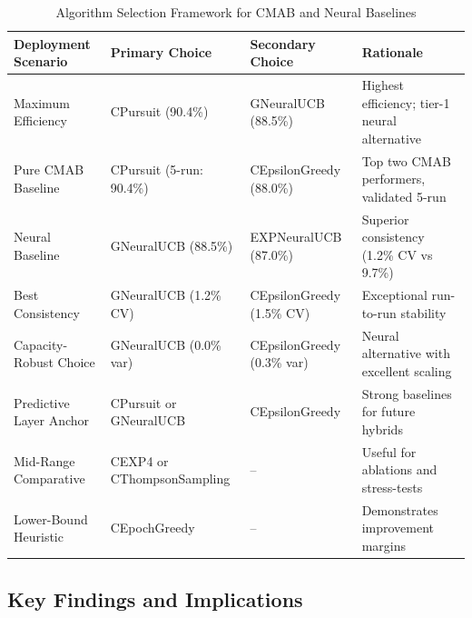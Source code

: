 \documentclass[12pt,a4paper]{article}
\begin{document}
\begin{table}[H]
\scriptsize
\centering
\caption{Algorithm Selection Framework for CMAB and Neural Baselines}
\begin{tabular}{|l|l|l|l|}
\hline
\textbf{Deployment Scenario} & \textbf{Primary Choice} & \textbf{Secondary Choice} & \textbf{Rationale} \\
\hline
\hline
Maximum Efficiency & CPursuit (90.4\%) & GNeuralUCB (88.5\%) & Highest efficiency; tier-1 neural alternative \\
Pure CMAB Baseline & CPursuit (5-run: 90.4\%) & CEpsilonGreedy (88.0\%) & Top two CMAB performers, validated 5-run \\
Neural Baseline & GNeuralUCB (88.5\%) & EXPNeuralUCB (87.0\%) & Superior consistency (1.2\% CV vs 9.7\%) \\
Best Consistency & GNeuralUCB (1.2\% CV) & CEpsilonGreedy (1.5\% CV) & Exceptional run-to-run stability \\
Capacity-Robust Choice & GNeuralUCB (0.0\% var) & CEpsilonGreedy (0.3\% var) & Neural alternative with excellent scaling \\
Predictive Layer Anchor & CPursuit or GNeuralUCB & CEpsilonGreedy & Strong baselines for future hybrids \\
Mid-Range Comparative & CEXP4 or CThompsonSampling & --           & Useful for ablations and stress-tests \\
Lower-Bound Heuristic & CEpochGreedy & --           & Demonstrates improvement margins \\
\hline
\end{tabular}
\end{table}

\subsection{Key Findings and Implications}
\end{document}
